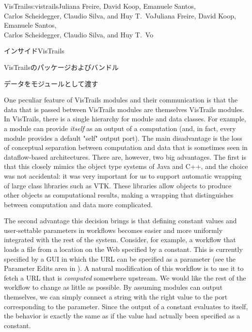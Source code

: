 \begin{aosachaptertoc}{VisTrails}{s:vistrails}{Juliana Freire, David Koop, Emanuele Santos, \\ Carlos Scheidegger, Claudio Silva, and Huy T.\ Vo}{Juliana Freire, David Koop, Emanuele Santos, \\ \hspace*{0.9cm} Carlos Scheidegger, Claudio Silva, and Huy T.\ Vo}
\begin{aosasect1}{インサイドVisTrails}
\begin{aosasect2}{VisTrailsのパッケージおよびバンドル}
\end{aosasect2}

\begin{aosasect2}{データをモジュールとして渡す}

One peculiar feature of VisTrails modules and their communication is
that the data that is passed between VisTrails modules are themselves
VisTrails modules. In VisTrails, there is a single hierarchy for
module and data classes. For example, a module can provide
\emph{itself} as an output of a computation (and, in fact, every
module provides a default "self" output port). The main disadvantage
is the loss of conceptual separation between computation and data that
is sometimes seen in dataflow-based architectures. There are, however,
two big advantages.  The first is that this closely mimics the object
type systems of Java and C++, and the choice was not accidental: it
was very important for us to support automatic wrapping of large class
libraries such as VTK.  These libraries allow objects to produce
other objects as computational results, making a wrapping that
distinguishes between computation and data more complicated.

The second advantage this decision brings is that defining constant
values and user-settable parameters in workflows becomes easier and
more uniformly integrated with the rest of the system. Consider, for
example, a workflow that loads a file from a location on the Web
specified by a constant. This is currently specified by a GUI in which
the URL can be specified as a parameter (see the Parameter Edits area
in ). A natural modification of
this workflow is to use it to fetch a URL that is \emph{computed}
somewhere upstream. We would like the rest of the workflow to change
as little as possible. By assuming modules can output themselves, we
can simply connect a string with the right value to the port
corresponding to the parameter. Since the output of a constant
evaluates to itself, the behavior is exactly the same as if the value
had actually been specified as a constant.



\end{aosasect2}
\end{aosasect1}
\end{aosachaptertoc}
